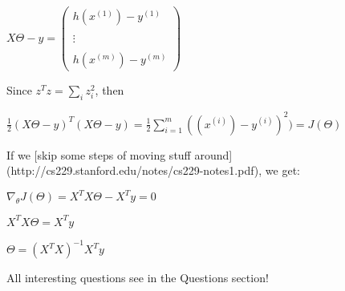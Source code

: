 $X\Theta - y = \begin{pmatrix} h(x^{(1)}) - y^{(1)} \\\\ \vdots \\\\ h(x^{(m)}) - y^{(m)}\end{pmatrix}$

Since $z^{T}z = \sum_{i}z_{i}^{2}$, then

$\frac{1}{2}(X\Theta - y)^{T}(X\Theta - y) = \frac{1}{2}\sum_{i=1}^m((x^{(i)}) - y^{(i)})^{2}) = J(\Theta)$

If we [skip some steps of moving stuff around](http://cs229.stanford.edu/notes/cs229-notes1.pdf), we get:

$\nabla_{\theta} J(\Theta) = X^{T}X\Theta - X^{T}y = 0$

$X^{T}X\Theta = X^{T}y$

$\boxed{\Theta = (X^{T}X)^{-1}X^{T}y}$

All interesting questions see in the Questions section!
